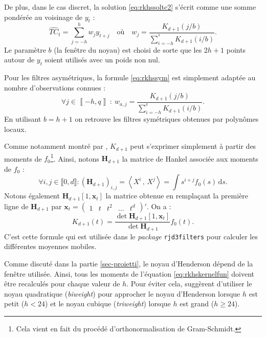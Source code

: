 \documentclass[
  12pt,
  a4paper,french]{article}
\newcommand\1{\mathds{1}}
\newcommand\ud{\,\mathrm{d}}
\newcommand{\ps}[2]{\left\langle #1 \,,\, #2 \right\rangle}
\begin{document}
De plus, dans le cas discret, la solution \eqref{eq:rkhssoltc2} s'écrit comme une somme pondérée au voisinage de \(y_t\) :
\begin{equation}
\widehat{TC}_t=\sum_{j=-h}^h w_j y_{t+j}\quad
\text{où} \quad
w_j=\frac{K_{d+1}(j/b)}{\sum_{i=-h}^{^h}K_{d+1}(i/b)}.
\label{eq:rkhssym}
\end{equation}
Le paramètre \(b\) (la fenêtre du noyau) est choisi de sorte que les \(2h+1\) points autour de \(y_t\) soient utilisés avec un poids non nul.

Pour les filtres asymétriques, la formule \eqref{eq:rkhssym} est simplement adaptée au nombre d'observations connues :
\begin{equation}
\forall j\in\left\llbracket -h,q\right\rrbracket\::\: w_{a,j}=\frac{K_{d+1}(j/b)}{\sum_{i=-h}^{^q}K_{d+1}(i/b)}.
\label{eq:rkhsasym}
\end{equation}
En utilisant \(b=h+1\) on retrouve les filtres symétriques obtenues par polynômes locaux.

Comme notamment montré par \textcite{dagumbianconcini2016seasonal}, \(K_{d+1}\) peut s'exprimer simplement à partir des moments de \(f_0\)\footnote{
  Cela vient en fait du procédé d'orthonormalisation de Gram-Schmidt.}.
Ainsi, notons \(\boldsymbol H_{d+1}\) la matrice de Hankel associée aux moments de \(f_0\) :
\[
\forall i,j\in \llbracket 0, d\rrbracket:
\left(\boldsymbol H_{d+1}\right)_{i,j}=\ps{X^i}{X^j}=\int s^{i+j}f_0(s)\ud s.
\]
Notons également \(\boldsymbol H_{d+1}[1,\boldsymbol x_t]\) la matrice obtenue en remplaçant la première ligne de \(\boldsymbol H_{d+1}\) par \(\boldsymbol x_t=\begin{pmatrix} 1 & t & t^2 & \dots & t^d\end{pmatrix}'\).
On a :
\begin{equation}
K_{d+1}(t)=\frac{\det{\boldsymbol H_{d+1}[1,\boldsymbol x_t]}}{\det{\boldsymbol H_{d+1}}}f_0(t).
\label{eq:rkhskernelfun}
\end{equation}
C'est cette formule qui est utilisée dans le \emph{package} \texttt{rjd3filters} pour calculer les différentes moyennes mobiles.

Comme discuté dans la partie \ref{sec-proietti}, le noyau d'Henderson dépend de la fenêtre utilisée.
Ainsi, tous les moments de l'équation \eqref{eq:rkhskernelfun} doivent être recalculés pour chaque valeur de \(h\).
Pour éviter cela, \textcite{dagumbianconcini2008} suggèrent d'utiliser le noyau quadratique (\emph{biweight}) pour approcher le noyau d'Henderson lorsque \(h\) est petit (\(h< 24\)) et le noyau cubique (\emph{triweight}) lorsque \(h\) est grand (\(h\geq 24\)).
\end{document}
